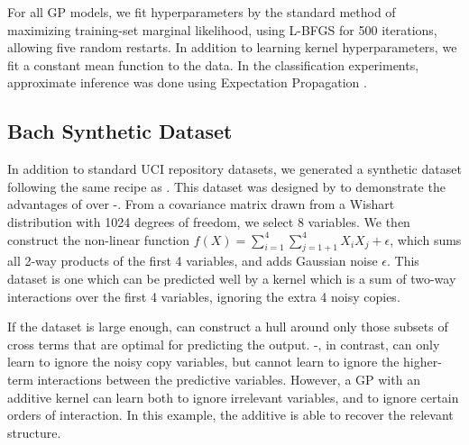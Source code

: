 For all GP models, we fit hyperparameters by the standard method of maximizing training-set marginal likelihood, using L-BFGS \citep{nocedal1980updating} for 500 iterations, allowing five random restarts.
In addition to learning kernel hyperparameters, we fit a constant mean function to the data.
%
In the classification experiments, approximate \gp{} inference was done using Expectation Propagation \citep{minka2001expectation}.

\subsection{Bach Synthetic Dataset}
In addition to standard UCI repository datasets, we generated a synthetic dataset following the same recipe as \cite{DBLP:journals/corr/abs-0909-0844}.
This dataset was designed by \cite{DBLP:journals/corr/abs-0909-0844} to demonstrate the advantages of \HKL{} over \gp{}-\ARD{}.
From a covariance matrix drawn from a Wishart distribution with 1024 degrees of freedom, we select 8 variables.
We then construct the non-linear function $f(X) = \sum_{i=1}^4 \sum_{j=1+1}^4 X_i X_j + \epsilon$, which sums all 2-way products of the first 4 variables, and adds Gaussian noise $\epsilon$.
This dataset is one which can be predicted well by a kernel which is a sum of two-way interactions over the first 4 variables, ignoring the extra 4 noisy copies.%

If the dataset is large enough, \HKL{} can construct a hull around only those subsets of cross terms that are optimal for predicting the output.
\gp{}-\ARD{}, in contrast, can only learn to ignore the noisy copy variables, but cannot learn to ignore the higher-term interactions between the predictive variables.
However, a GP with an additive kernel can learn both to ignore irrelevant variables, and to ignore certain orders of interaction.
In this example, the additive \gp{} is able to recover the relevant structure.

%

